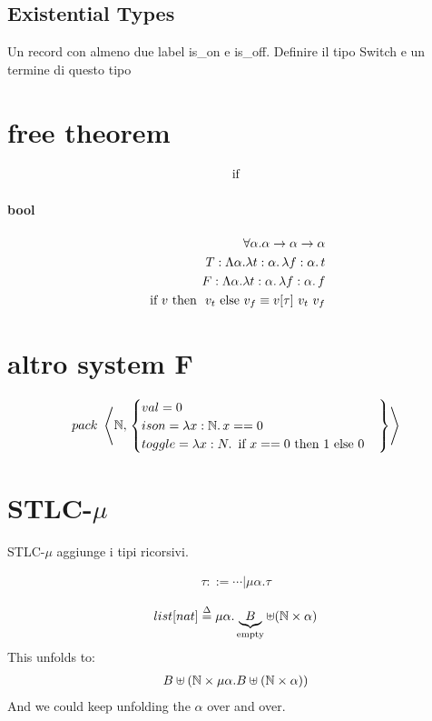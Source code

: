 \documentclass{article}
\begin{document}
\subsection{Existential Types}

Un record con almeno due label is\_on e is\_off. 
Definire il tipo Switch e un termine di questo tipo

\section{free theorem}
\begin{align*}
    \text{ if } 
\end{align*}

\paragraph{bool}
\begin{align*}
    \forall\alpha.\alpha\to\alpha\to\alpha \\
    T: \Lambda\alpha.\lambda t:\alpha\ldotp \lambda f:\alpha\ldotp t \\
    F: \Lambda\alpha.\lambda t:\alpha\ldotp \lambda f:\alpha\ldotp f \\
    \text{ if } v \text{ then }\ v_t \text{ else } v_f \equiv v[\tau]\ v_t\ v_f
\end{align*}

\section{altro system F}
\begin{align*}
    pack\ \left\langle\N,\left.\begin{cases}val=0\\ison=\lam{x:\N}{x==0}\\toggle=\lam{x:N}{\IF x==0\THEN 1 \ELSE 0}\end{cases}\right\}\right\rangle
\end{align*}

\section{STLC-$\mu$}
STLC-$\mu$ aggiunge i tipi ricorsivi.

\begin{align*}
    \tau ::= \cdots | \mu\alpha.\tau
\end{align*}

\begin{align*}
    list[nat] \overset{\Delta}{=}\mu\alpha.\underbrace{B}_\text{empty}\uplus(\mathbb N\times\alpha)
\end{align*}
This unfolds to:
\begin{gather*}
    B\uplus(\mathbb N\times \mu\alpha. B\uplus(\mathbb N\times\alpha))
\end{gather*}
And we could keep unfolding the $\alpha$ over and over.
\end{document}
